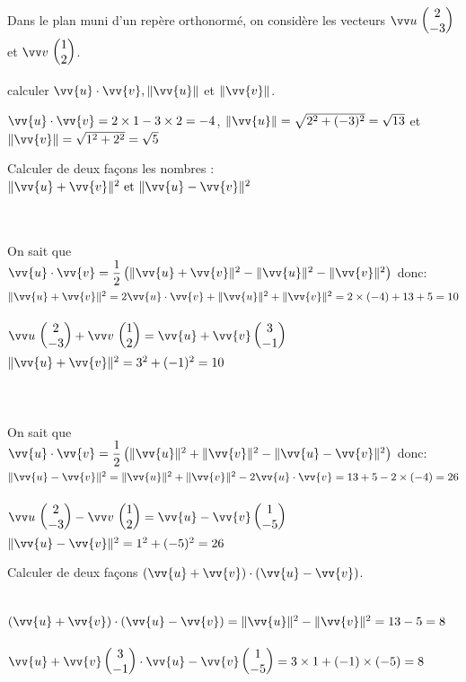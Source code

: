\documentclass[12pt,a4paper]{article}  %
\begin{document}
\exerciceDS{}
Dans le plan muni d'un repère orthonormé, on considère les vecteurs
$\Coord{u}{2}{-3}$ et $\Coord{v}{1}{2}$.
\begin{enumMet}
    \item calculer $\vv{u} \cdot \vv{v},\|\vv{u}\|$ et $\|\vv{v}\|$.\\
    \begin{corrBox}
        $\vv{u}\cdot\vv{v}=2\times1-3\times2=-4$, $\left\|\vv{u}\right\|=\sqrt{2^2+(-3)^2}=\sqrt{13}$ et $\left\|\vv{v}\right\|=\sqrt{1^2+2^2}=\sqrt{5}$
    \end{corrBox}
    \item Calculer de deux façons les nombres : $\|\vv{u}+\vv{v}\|^{2} \text { et }\|\vv{u}-\vv{v}\|^{2}$\\
    \begin{corrBox}
        \\
        \\
        On sait que $\vv{u} \cdot \vv{v}=\dfrac{1}{2}\left(\|\vv{u}+\vv{v}\|^{2}-\|\vv{u}\|^{2}-\|\vv{v}\|^{2}\right)$ donc:\\
        $\|\vv{u}+\vv{v}\|^{2}=2\vv{u} \cdot \vv{v}+\|\vv{u}\|^{2}+\|\vv{v}\|^{2}=2\times(-4)+13+5=10$\\
        \\
        $\Coord{u}{2}{-3}+\Coord{v}{1}{2}=\vv{u}+\vv{v} \CoordSV{3}{-1}$\\
        $\|\vv{u}+\vv{v}\|^{2}=3^2+(-1)^2=10$\\
        \ \\
        \\
        \\
        On sait que $\vv{u} \cdot \vv{v}=\dfrac{1}{2}\left(\|\vv{u}\|^{2}+\|\vv{v}\|^{2}-\|\vv{u}-\vv{v}\|^{2}\right)$ donc:\\
        $\|\vv{u}-\vv{v}\|^{2}=\|\vv{u}\|^{2}+\|\vv{v}\|^{2}-2\vv{u} \cdot \vv{v}=13+5-2\times(-4)=26$\\
        \\
        $\Coord{u}{2}{-3}-\Coord{v}{1}{2}=\vv{u}-\vv{v} \CoordSV{1}{-5}$\\
        $\|\vv{u}-\vv{v}\|^{2}=1^2+(-5)^2=26$
    \end{corrBox}
    \item Calculer de deux façons $(\vv{u}+\vv{v}) \cdot(\vv{u}-\vv{v})$.\\
    \begin{corrBox}
        \\
            $(\vv{u}+\vv{v}) \cdot(\vv{u}-\vv{v})=\|\vv{u}\|^{2}-\|\vv{v}\|^{2}=13-5=8$\\
        \\
        $\vv{u}+\vv{v} \CoordSV{3}{-1} \cdot \vv{u}-\vv{v} \CoordSV{1}{-5}=3\times1+(-1)\times(-5)=8$
    \end{corrBox}
    
\end{enumMet}
\end{document}
